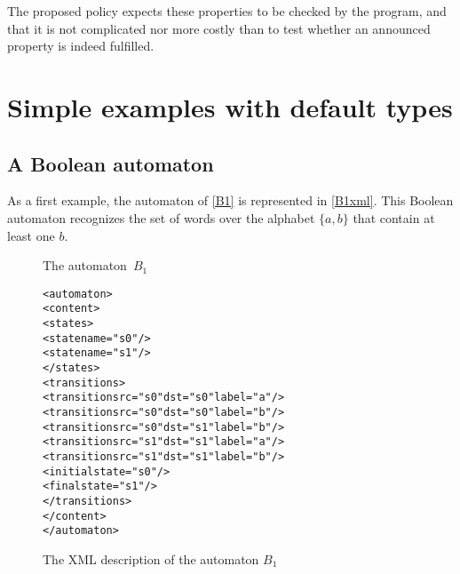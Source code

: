 \documentclass[a4paper]{article}
\newcommand{\medskipneg}{\vspace*{-2ex}} %
\newcommand{\xattr}[1]{\texttt{#1}}
\begin{document}
The proposed policy expects these properties to be checked by the
program, and that it is not complicated nor more costly than to test
whether an announced property is indeed fulfilled.

\section{Simple examples with default types}
\subsection{A Boolean automaton}

As a first example, the automaton of \autoref{B1} is represented in
\autoref{B1xml}. This Boolean automaton recognizes the set of words
over the alphabet $\{a,b\}$ that contain at least one $b$.

\begin{figure}[ht]
\begin{center}
\end{center}
\vspace*{-.8cm}
\caption{The automaton~$B_1$}\label{B1}
\medskipneg
\end{figure}

\begin{figure}[ht]
  \small
  \begin{center}
\begin{alltt}
<automaton>
  <content>
    <states>
       <state name="s0"/>
       <state name="s1"/>
    </states>
    <transitions>
       <transition \xattr{src}="s0" \xattr{dst}="s0" label="a"/>
       <transition \xattr{src}="s0" \xattr{dst}="s0" label="b"/>
       <transition \xattr{src}="s0" \xattr{dst}="s1" label="b"/>
       <transition \xattr{src}="s1" \xattr{dst}="s1" label="a"/>
       <transition \xattr{src}="s1" \xattr{dst}="s1" label="b"/>
       <initial state="s0"/>
       <final state="s1"/>
    </transitions>
  </content>
</automaton>
\end{alltt}

\caption{The XML description of the automaton $B_1$}
\label{B1xml}
  \end{center}
\end{figure}
\end{document}
